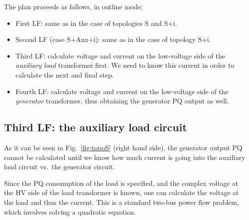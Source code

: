 \documentclass[a4paper,11pt]{article}
\begin{document}
The plan proceeds as follows, in outline mode:
\begin{itemize}
\item First LF: same as in the case of topologies S and S+i.
\item Second LF (case S+Aux+i): same as in the case of topology S+i.
\item Third LF: calculate voltage and current on the low-voltage side of the
  \emph{auxiliary load} transformer first. We need to know this current in order
  to calculate the next and final step.
\item Fourth LF: calculate voltage and current on the low-voltage side of the
  \emph{generator} transformer, thus obtaining the generator PQ output as well.
\end{itemize}


\subsection{Third LF: the auxiliary load circuit}

As it can be seen in Fig.~\ref{fig:topoS} (right hand side), the generator output PQ
cannot be calculated until we know how much current is going into the auxiliary load
circuit vs.\ the generator circuit.

Since the PQ consumption of the load is specified, and the complex voltage at the HV
side of the load transformer is known, one can calculate the voltage at the load and
thus the current.  This is a standard two-bus power flow problem, which involves solving
a quadratic equation.
\end{document}
